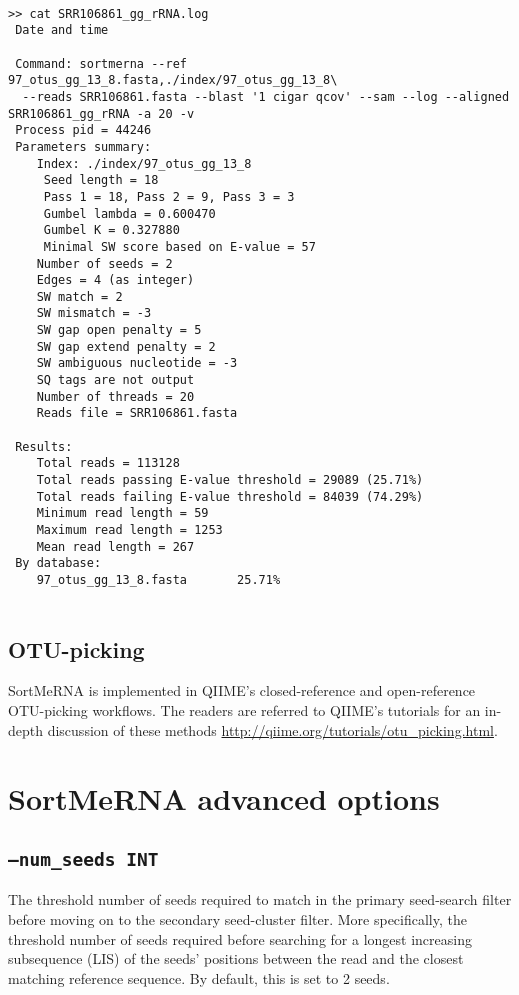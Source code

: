 \documentclass[10pt,a4paper]{article}
\begin{document}
\begin{Verbatim}[fontsize=\footnotesize]

>> cat SRR106861_gg_rRNA.log 
 Date and time

 Command: sortmerna --ref 97_otus_gg_13_8.fasta,./index/97_otus_gg_13_8\
  --reads SRR106861.fasta --blast '1 cigar qcov' --sam --log --aligned SRR106861_gg_rRNA -a 20 -v 
 Process pid = 44246
 Parameters summary:
    Index: ./index/97_otus_gg_13_8
     Seed length = 18
     Pass 1 = 18, Pass 2 = 9, Pass 3 = 3
     Gumbel lambda = 0.600470
     Gumbel K = 0.327880
     Minimal SW score based on E-value = 57
    Number of seeds = 2
    Edges = 4 (as integer)
    SW match = 2
    SW mismatch = -3
    SW gap open penalty = 5
    SW gap extend penalty = 2
    SW ambiguous nucleotide = -3
    SQ tags are not output
    Number of threads = 20
    Reads file = SRR106861.fasta

 Results:
    Total reads = 113128
    Total reads passing E-value threshold = 29089 (25.71%)
    Total reads failing E-value threshold = 84039 (74.29%)
    Minimum read length = 59
    Maximum read length = 1253
    Mean read length = 267
 By database:
    97_otus_gg_13_8.fasta		25.71%
    
\end{Verbatim}

\newpage
\subsection{OTU-picking}

SortMeRNA is implemented in QIIME's closed-reference and open-reference OTU-picking workflows.
The readers are referred to QIIME's tutorials for an in-depth discussion of these methods
\url{http://qiime.org/tutorials/otu_picking.html}.

\section{SortMeRNA advanced options}

\subsection*{{\tt --num\_seeds INT}}
The threshold number of seeds required to match in the primary seed-search filter before 
moving on to the secondary seed-cluster filter. More specifically, the threshold number of 
seeds required before searching for a longest increasing subsequence (LIS) of the seeds' positions
between the read and the closest matching reference sequence. By default, this is set to 2 seeds. 
\end{document}
